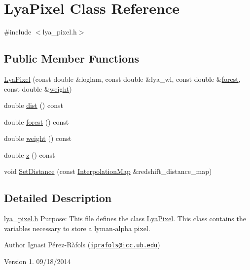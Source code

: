 \hypertarget{class_lya_pixel}{\section{Lya\-Pixel Class Reference}
\label{class_lya_pixel}
}


{\ttfamily \#include $<$lya\-\_\-pixel.\-h$>$}

\subsection*{Public Member Functions}
\begin{DoxyCompactItemize}
\item 
\hyperlink{class_lya_pixel_a9bbe95c12b7b43d010b89c9bed10853e}{Lya\-Pixel} (const double \&loglam, const double \&lya\-\_\-wl, const double \&\hyperlink{class_lya_pixel_a6816dd39eb9888c4054355101b135a02}{forest}, const double \&\hyperlink{class_lya_pixel_a0fb854ab3bef9d2001613920fdaf8d71}{weight})
\item 
double \hyperlink{class_lya_pixel_a48aa6b5e98069716a15ee000f41627bc}{dist} () const 
\item 
double \hyperlink{class_lya_pixel_a6816dd39eb9888c4054355101b135a02}{forest} () const 
\item 
double \hyperlink{class_lya_pixel_a0fb854ab3bef9d2001613920fdaf8d71}{weight} () const 
\item 
double \hyperlink{class_lya_pixel_a1259c61a03d2bfc5522a0465e1fabcdb}{z} () const 
\item 
void \hyperlink{class_lya_pixel_a78fa41d6b076915c0d3dfc5036c3f917}{Set\-Distance} (const \hyperlink{class_interpolation_map}{Interpolation\-Map} \&redshift\-\_\-distance\-\_\-map)
\end{DoxyCompactItemize}


\subsection{Detailed Description}
\hyperlink{lya__pixel_8h}{lya\-\_\-pixel.\-h} Purpose\-: This file defines the class \hyperlink{class_lya_pixel}{Lya\-Pixel}. This class contains the variables necessary to store a lyman-\/alpha pixel.

\begin{DoxyAuthor}{Author}
Ignasi Pérez-\/\-Ràfols (\href{mailto:iprafols@icc.ub.edu}{\tt iprafols@icc.\-ub.\-edu}) 
\end{DoxyAuthor}
\begin{DoxyVersion}{Version}
1. 09/18/2014 
\end{DoxyVersion}


